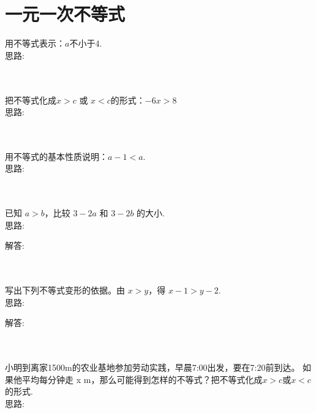 \section{一元一次不等式}

\item {
    用不等式表示：$a$不小于4.
    \ifshowSolution
        \fangsong{}
        \\
        思路:
    \else
        \\ \\ \\
    \fi
}

\item {
    把不等式化成$x>c$ 或 $x<c$的形式：$-6x > 8$
    \ifshowSolution
        \fangsong{}
        \\
        思路:
    \else
        \\ \\ \\
    \fi
}

\item {
    用不等式的基本性质说明：$a-1<a$.
    \ifshowSolution
        \fangsong{}
        \\
        思路:
    \else
        \\ \\ \\
    \fi
}

\item {
    已知 $a > b$，比较 $3-2a$ 和 $3-2b$ 的大小.
    \ifshowSolution
        \fangsong{}
        \\
        思路:

        解答: 
    \else
        \\ \\ \\
    \fi
}

\item {
    写出下列不等式变形的依据。由 $x > y$，得 $x-1 > y-2$.
    \ifshowSolution
        \fangsong{}
        \\
        思路:

        解答: 
    \else
        \\ \\ \\
    \fi
}

\item {
    小明到离家1500m的农业基地参加劳动实践，早晨7:00出发，要在7:20前到达。 如果他平均每分钟走 x m，那么可能得到怎样的不等式？把不等式化成$x>c$或$x<c$的形式.
    \ifshowSolution
        \fangsong{}
        \\
        思路:
    \else
        \\ \\ \\
    \fi
}

